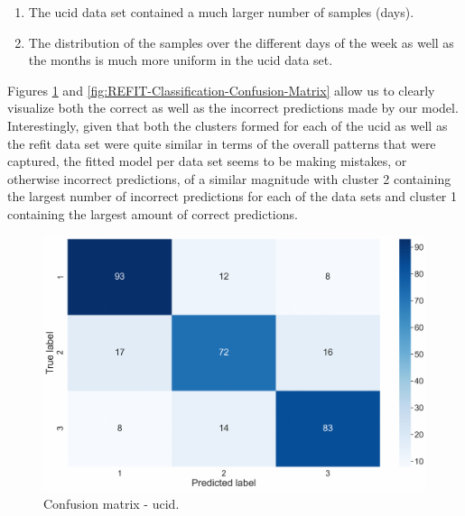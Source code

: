 \begin{enumerate}
    \item The \gls{ucid} data set contained a much larger number of samples (days).
    \item The distribution of the samples over the different days of the week as well as the months is much more uniform in the \gls{ucid} data set.
\end{enumerate}

\noindent \newline Figures \ref{fig:UCID-Classification-Confusion-Matrix} and \ref{fig:REFIT-Classification-Confusion-Matrix} allow us to clearly visualize both the correct as well as the incorrect predictions made by our model. Interestingly, given that both the clusters formed for each of the \gls{ucid} as well as the \gls{refit} data set were quite similar in terms of the overall patterns that were captured, the fitted model per data set seems to be making mistakes, or otherwise incorrect predictions, of a similar magnitude with cluster 2 containing the largest number of incorrect predictions for each of the data sets and cluster 1 containing the largest amount of correct predictions.

\begin{figure}[H]
    \centering
    \includegraphics[width=\textwidth]{Images/Chapter 6/UCID/UCID-Classification-Confusion-Matrix-1.pdf}
    \caption{Confusion matrix - \gls{ucid}.}
    \label{fig:UCID-Classification-Confusion-Matrix}
\end{figure}

